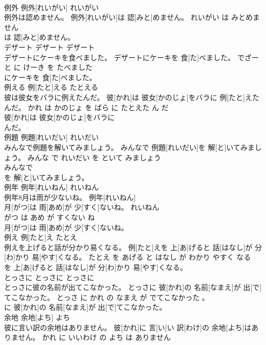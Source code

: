 \documentclass[8pt]{extreport}
\begin{document}
\begin{CJK}{UTF8}{min}
\\	例外	例外[れいがい]	れいがい	
\\	例外は認めません。	例外[れいがい]は 認[みと]めません。	れいがい は みとめません	
\\	は 認[みと]めません。			
\\	デザート	デザート	デザート	
\\	デザートにケーキを食べました。	デザートにケーキを 食[た]べました。	でざーと に けーき を たべました	
\\	にケーキを 食[た]べました。			
\\	例える	例[たと]える	たとえる	
\\	彼は彼女をバラに例えたんだ。	彼[かれ]は 彼女[かのじょ]をバラに 例[たと]えたんだ。	かれ は かのじょ を ばら に たとえた ん だ	
\\	彼[かれ]は 彼女[かのじょ]をバラに
\\	んだ。			
\\	例題	例題[れいだい]	れいだい	
\\	みんなで例題を解いてみましょう。	みんなで 例題[れいだい]を 解[と]いてみましょう。	みんな で れいだい を といて みましょう	
\\	みんなで
\\	を 解[と]いてみましょう。			
\\	例年	例年[れいねん]	れいねん	
\\	例年8月は雨が少ないね。	例年[れいねん] 
\\	月[がつ]は 雨[あめ]が 少[すく]ないね。	れいねん 
\\	がつ は あめ が すくない ね	
\\	月[がつ]は 雨[あめ]が 少[すく]ないね。			
\\	例え	例[たと]え	たとえ	
\\	例えを上げると話が分かり易くなる。	例[たと]えを 上[あ]げると 話[はなし]が 分[わ]かり 易[やす]くなる。	たとえ を あげる と はなし が わかり やすく なる	
\\	を 上[あ]げると 話[はなし]が 分[わ]かり 易[やす]くなる。			
\\	とっさに	とっさに	とっさに	
\\	とっさに彼の名前が出てこなかった。	とっさに 彼[かれ]の 名前[なまえ]が 出[で]てこなかった。	とっさ に かれ の なまえ が でてこなかった 。	
\\	に 彼[かれ]の 名前[なまえ]が 出[で]てこなかった。			
\\	余地	余地[よち]	よち	
\\	彼に言い訳の余地はありません。	彼[かれ]に 言[い]い 訳[わけ]の 余地[よち]はありません。	かれ に いいわけ の よち は ありません	

\end{CJK}
\end{document}
